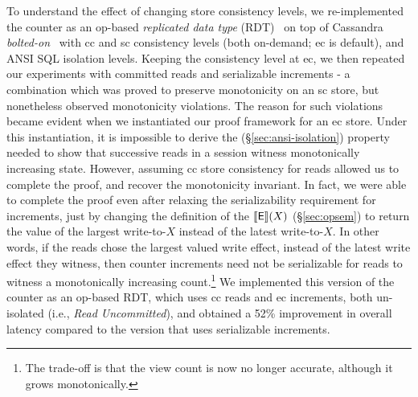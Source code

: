 To understand the effect of changing store consistency levels, we
re-implemented the counter as an op-based \emph{replicated data type}
(RDT)~\cite{crdt,burckhardt14} on top of Cassandra
\emph{bolted-on}~\cite{bailisbolton} with {\sc cc} and {\sc sc}
consistency levels (both on-demand; {\sc ec} is default), and ANSI SQL
isolation levels. Keeping the consistency level at {\sc ec}, we then
repeated our experiments with committed reads and serializable
increments - a combination which was proved to preserve monotonicity
on an {\sc sc} store, but nonetheless observed monotonicity
violations. The reason for such violations became evident when
we instantiated our proof framework for an {\sc ec} store.
Under this instantiation, it is impossible to derive the
 (\S\ref{sec:ansi-isolation}) property needed to show
that successive reads in a session witness monotonically increasing
state. However, assuming {\sc cc} store consistency for reads allowed
us to complete the proof, and recover the monotonicity invariant. In
fact, we were able to complete the proof even after relaxing the
serializability requirement for increments, just by changing the
definition of the $\llbracket \textsf{E} \rrbracket(X)$ (\S\ref{sec:opsem}) to return the
value of the largest write-to-$X$ instead of the latest write-to-$X$.
In other words, if the reads chose the largest valued write effect,
instead of the latest write effect they witness, then counter
increments need not be serializable for reads to witness a
monotonically increasing count.\footnote{The trade-off is that the view
count is now no longer accurate, although it grows monotonically.}
We implemented this version of the counter as an op-based RDT, which
uses {\sc cc} reads and {\sc ec} increments, both un-isolated (i.e.,
\emph{Read Uncommitted}), and obtained a 52\% improvement in overall
latency compared to the version that uses serializable increments.
\vspace*{-3pt}

